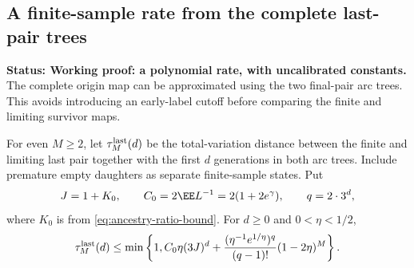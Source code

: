 \documentclass[11pt,letterpaper]{article}
\newcommand{\status}[1]{\textbf{Status: #1.}}
\begin{document}
\subsection{A finite-sample rate from the complete last-pair trees}
\label{sec:full-tree-rate}

\status{Working proof: a polynomial rate, with uncalibrated constants}
The complete origin map can be approximated using the two final-pair
arc trees. This avoids introducing an early-label cutoff before
comparing the finite and limiting survivor maps.

\begin{lemma}
\label{lem:full-root-rate}
For even $M\ge2$, let $\tau_M^{\rm last}(d)$ be the total-variation
distance between the finite and limiting last pair together with the
first $d$ generations in both arc trees. Include premature empty
daughters as separate finite-sample states. Put
\[
 J=1+K_0,\qquad C_0=2\EE L^{-1}=2(1+2e^\gamma),
 \qquad q=2\cdot3^d,
\]
where $K_0$ is from \eqref{eq:ancestry-ratio-bound}.
For $d\ge0$ and $0<\eta<1/2$,
\begin{equation}\label{eq:full-root-TV}
 \tau_M^{\rm last}(d)\le\min\left\{1,
 C_0\eta(3J)^d
 +\frac{(\eta^{-1}e^{1/\eta})^q}{(q-1)!}(1-2\eta)^M\right\}.
\end{equation}
\end{lemma}
\end{document}
